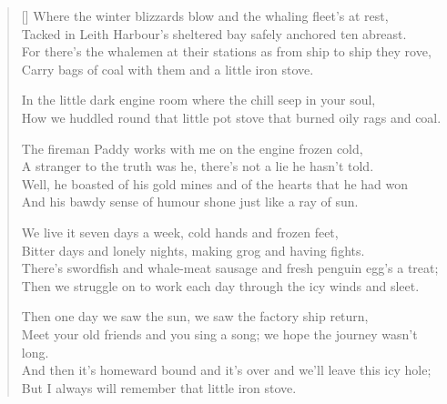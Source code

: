 \pagebreak
\settowidth{\versewidth}{For there's the whalemen at their stations as from ship to ship they rove,}
\begin{verse}[\versewidth]
Where the winter blizzards blow and the whaling fleet's at rest,\\
Tacked in Leith Harbour's sheltered bay safely anchored ten abreast.\\
For there's the whalemen at their stations as from ship to ship they rove,\\
Carry bags of coal with them and a little iron stove.

\begin{chorus}
In the little dark engine room where the chill seep in your soul,\\
How we huddled round that little pot stove that burned oily rags and coal.
\end{chorus}

The fireman Paddy works with me on the engine frozen cold,\\
A stranger to the truth was he, there's not a lie he hasn't told.\\
Well, he boasted of his gold mines and of the hearts that he had won\\
And his bawdy sense of humour shone just like a ray of sun.

We live it seven days a week, cold hands and frozen feet,\\
Bitter days and lonely nights, making grog and having fights.\\
There's swordfish and whale-meat sausage and fresh penguin egg's a treat;\\
Then we struggle on to work each day through the icy winds and sleet.

Then one day we saw the sun, we saw the factory ship return,\\
Meet your old friends and you sing a song; we hope the journey wasn't long.\\
And then it's homeward bound and it's over and we'll leave this icy hole;\\
But I always will remember that little iron stove.

\end{verse}
